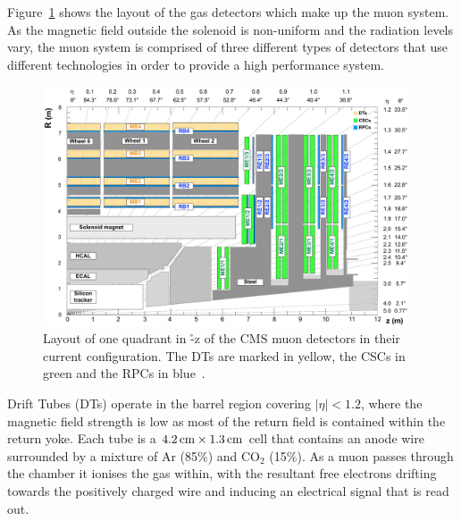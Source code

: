 Figure~\ref{fig:muonChambers} shows the layout of the gas detectors which make up the muon system.
As the magnetic field outside the solenoid is non-uniform and the radiation levels vary, the muon system is comprised of three different types of detectors that use different technologies in order to provide a high performance system. 

\begin{figure}[htbp]
\begin{center}
\includegraphics[width=0.97\textwidth]{figs/cms/cms_muon_quadrant_run_ii.pdf}
\caption{Layout of one quadrant in \r-z of the CMS muon detectors in their current configuration.
The DTs are marked in yellow, the CSCs in green and the RPCs in blue~\cite{CMS-DP-2016-046}.}
\label{fig:muonChambers}
\end{center}
\end{figure}

Drift Tubes (DTs) operate in the barrel region covering $|\eta| < 1.2$, where the magnetic field strength is low as most of the return field is contained within the return yoke.
Each tube is a $4.2\,\text{cm} \times 1.3\,\text{cm}$ cell that contains an anode wire surrounded by a mixture of Ar (85\%) and CO$_{2}$ (15\%).
As a muon passes through the chamber it ionises the gas within, with the resultant free electrons drifting towards the positively charged wire and inducing an electrical signal that is read out.

